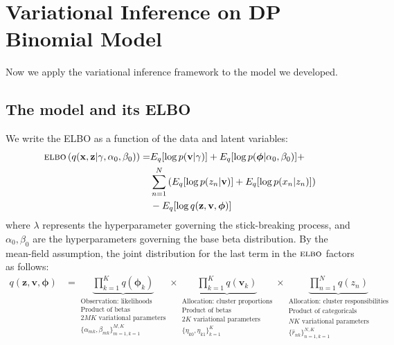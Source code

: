 \documentclass[11pt]{article}
\newcommand{\bx}{\ensuremath{\mathbf{x}}}
\newcommand{\bz}{\ensuremath{\mathbf{z}}}
\newcommand{\ELBO}{\textsc{elbo}}
\begin{document}
\newpage
\section{Variational Inference on DP Binomial Model}
Now we apply the variational inference framework to the model we developed.

\subsection{The model and its ELBO}

We write the ELBO as a function of the data and latent variables:
\begin{equation}
	\begin{split}
		\ELBO\left(q(\bx, \bz | \gamma, \alpha_0, \beta_0)\right) = &E_q[\log p(\mathbf{v} | \gamma)] + E_q[ \log p(\bm{\phi} | \alpha_0, \beta_0)] + \\ &\sum\limits_{n=1}^N \left( E_q[\log p(z_n | \mathbf{v})] + E_q[\log p(x_n | z_n)]\right) \\  &- E_q[\log q(\bz, \mathbf{v}, \bm{\phi})]
	\end{split}
\end{equation}
where $\lambda$ represents the hyperparameter governing the stick-breaking process, and $\alpha_0, \beta_0$ are the hyperparameters governing the base beta distribution. By the mean-field assumption, the joint distribution for the last term in the $\ELBO$ factors as follows:
\begin{align}
    q(\bz, \mathbf{v}, \bm{\phi}) &=
\underbrace{\prod\limits_{k=1}^K q(\bm{\phi}_k)}_{\substack{\text{Observation: likelihoods}  \\  \text{Product of betas} \\ 2MK \text{ variational parameters} \\  \{\alpha_{mk}, \beta_{mk} \}_{m=1, k=1}^{M, K} }} \times
 \underbrace{\prod\limits_{k=1}^K q(\mathbf{v}_k)}_{\substack{\text{Allocation: cluster proportions} \\ \text{Product of betas} \\ 2K \text{ variational parameters}  \\ \{\eta_{k0}, \eta_{k1}\}_{k=1}^K   }} \times
 \underbrace{\prod\limits_{n=1}^{N} q(z_n)}_{\substack{ \text{Allocation: cluster responsibilities} \\ \text{Product of categoricals} \\ NK \text{ variational parameters}  \\ \{\hat{r}_{nk}\}_{n=1, k=1}^{N, K}   }} \nonumber
\end{align}
\end{document}
